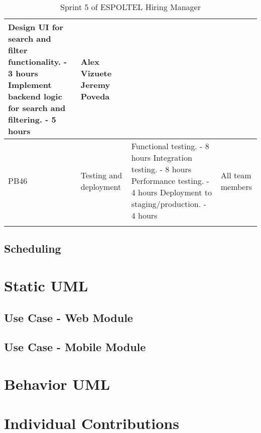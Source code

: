 \documentclass{scrreprt}
\begin{document}
\begin{longtable}{|p{1.5cm}|p{5.5cm}|p{4.5cm}|p{3cm}|}
	Design UI for search and filter functionality. - 3 hours \newline
	Implement backend logic for search and filtering. - 5 hours &
	Alex Vizuete \newline
	Jeremy Poveda \\ \hline
	
	PB46 & Testing and deployment &
	
	Functional testing. - 8 hours
	Integration testing. - 8 hours
	Performance testing. - 4 hours
	Deployment to staging/production. - 4 hours &
	All team members \\ \hline
	
	\caption{Sprint 5 of ESPOLTEL Hiring Manager}
\end{longtable}

\section{Scheduling}


\chapter{Static UML}
\section{Use Case - Web Module}
\section{Use Case - Mobile Module}



\chapter{Behavior UML}

    
\chapter{Individual Contributions}
\vspace{2cm}
\end{document}
